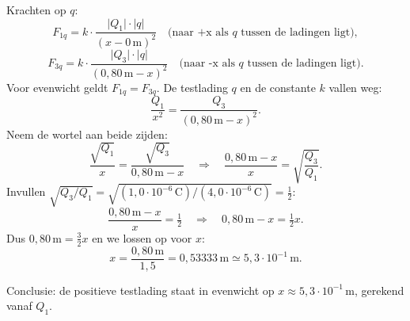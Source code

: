 \documentclass{ximera}
\begin{document}
\begin{exercise}
\begin{solution}
\begin{center}
        \end{center}
        
        Krachten op \(q\):
        \[
            F_{1q}=k\cdot \frac{\lvert Q_{1}\rvert \cdot \lvert q \rvert}{(x-0 \, \mathrm{m})^{2}}\quad\text{(naar +x als \(q\) tussen de ladingen ligt)},
        \]
        \[
            F_{3q}=k\cdot \frac{\lvert Q_{3}\rvert \cdot \lvert q \rvert}{(0{,}80 \, \mathrm{m}-x)^{2}}\quad\text{(naar -x als \(q\) tussen de ladingen ligt)}.
        \]
        Voor evenwicht geldt \(F_{1q}=F_{3q}\). De testlading \(q\) en de constante \(k\) vallen weg:
        \[
            \frac{Q_{1}}{x^{2}}=\frac{Q_{3}}{(0{,}80 \, \mathrm{m}-x)^{2}}.
        \]
        Neem de wortel aan beide zijden:
        \[
            \frac{\sqrt{Q_{1}}}{x}=\frac{\sqrt{Q_{3}}}{0{,}80 \, \mathrm{m}-x}
            \quad\Rightarrow\quad \frac{0{,}80 \, \mathrm{m}-x}{x}=\sqrt{\frac{Q_{3}}{Q_{1}}}.
        \]
        Invullen \(\sqrt{Q_{3}/Q_{1}}=\sqrt{(1{,}0 \cdot 10^{-6} \, \mathrm{C})/(4{,}0 \cdot 10^{-6} \, \mathrm{C})}=\tfrac{1}{2}\):
        \[
            \frac{0{,}80 \, \mathrm{m}-x}{x}=\tfrac{1}{2}\quad\Rightarrow\quad 0{,}80 \, \mathrm{m}-x=\tfrac{1}{2}x.
        \]
        Dus \(0{,}80 \, \mathrm{m} = \tfrac{3}{2}x\) en we lossen op voor $x$:
        \[
            x=\frac{0{,}80 \, \mathrm{m}}{1{,}5}= 0{,}53333 \, \mathrm{m}\simeq \boxed{5{,}3\cdot 10^{-1} \, \mathrm{m}}.
        \]

        Conclusie: de positieve testlading staat in evenwicht op \(x \approx 5{,}3\cdot 10^{-1} \, \mathrm{m}\), gerekend vanaf \(Q_{1}\).
    \end{solution}
\end{exercise}
\end{document}
